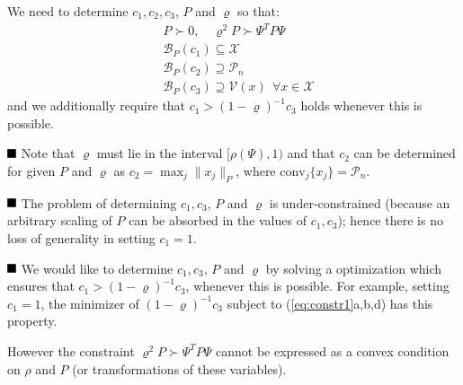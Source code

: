 \documentclass[11pt, oneside]{article}
\def\X{\mathcal{X}}
\def\P{\mathcal{P}}
\def\V{\mathcal{V}}
\def\B{\mathscr{B}}
\def\conv{\mathrm{conv}}
\begin{document}
%

We need to determine $c_1,c_2,c_3$, $P$ and $\varrho$ so that:
\begin{subequations}\label{eq:constr1}
\begin{align}
& P \succ 0  , \quad \varrho^2 P \succ \Psi^T P \Psi \\
& \B_P(c_1) \subseteq \X \\
& \B_P(c_2) \supseteq \P_n \\
& \B_P(c_3) \supseteq \V(x) \ \ \forall x \in \X
\end{align}
\end{subequations}
and we additionally require that $c_1 > (1-\varrho)^{-1}c_3$ holds whenever this is possible.

$\rule{7pt}{7pt}$\hspace{1ex}
Note that $\varrho$ must lie in the interval $[\rho(\Psi),1)$ and that 
$c_2$ can be determined for given $P$ and $\varrho$ as $c_2 = \max_j \|x_j\|_P$, where $\conv_j \{ x_j \} = \P_n$.

$\rule{7pt}{7pt}$\hspace{1ex}
The problem of determining $c_1,c_3$, $P$ and $\varrho$ is under-constrained (because an arbitrary scaling of $P$ can be absorbed in the values of $c_1,c_3$); hence there is no loss of generality in setting $c_1 =1$.

$\rule{7pt}{7pt}$\hspace{1ex}
We would like to determine $c_1, c_3$, $P$ and $\varrho$ by solving a optimization which ensures that $c_1 > (1-\varrho)^{-1}c_3$, whenever this is possible. For example, setting $c_1=1$, the minimizer of $(1-\varrho)^{-1}c_3$ subject to (\ref{eq:constr1}a,b,d) has this property.

However the constraint $\varrho^2 P \succ \Psi^T P \Psi$ cannot be expressed as a convex condition on $\rho$ and $P$ (or transformations of these variables). 
\end{document}
